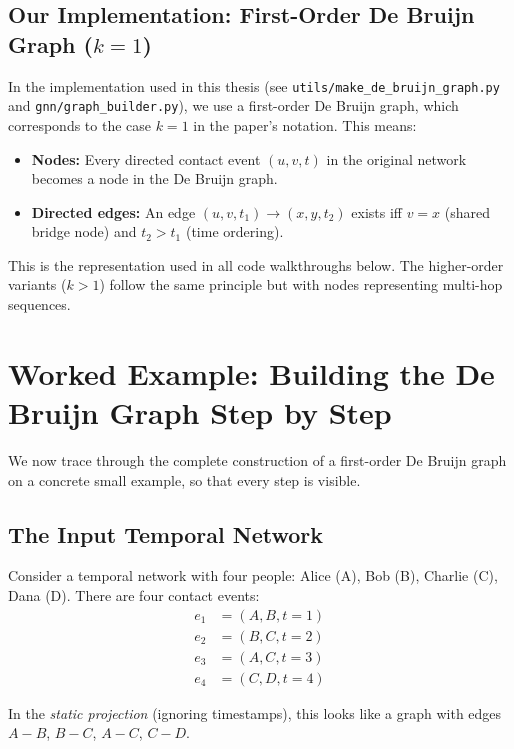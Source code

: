 \subsection{Our Implementation: First-Order De Bruijn Graph ($k=1$)}

In the implementation used in this thesis (see \texttt{utils/make\_de\_bruijn\_graph.py} and
\texttt{gnn/graph\_builder.py}), we use a first-order De Bruijn graph, which corresponds to the
case $k=1$ in the paper's notation. This means:
\begin{itemize}[noitemsep]
    \item \textbf{Nodes:} Every directed contact event $(u, v, t)$ in the original network
          becomes a node in the De Bruijn graph.
    \item \textbf{Directed edges:} An edge $(u, v, t_1) \to (x, y, t_2)$ exists iff $v = x$
          (shared bridge node) and $t_2 > t_1$ (time ordering).
\end{itemize}
This is the representation used in all code walkthroughs below. The higher-order variants ($k>1$)
follow the same principle but with nodes representing multi-hop sequences.

\section{Worked Example: Building the De Bruijn Graph Step by Step}

We now trace through the complete construction of a first-order De Bruijn graph on a concrete
small example, so that every step is visible.

\subsection{The Input Temporal Network}

Consider a temporal network with four people: Alice (A), Bob (B), Charlie (C), Dana (D). There
are four contact events:
\begin{align*}
    e_1 &= (A, B, t=1) \\
    e_2 &= (B, C, t=2) \\
    e_3 &= (A, C, t=3) \\
    e_4 &= (C, D, t=4)
\end{align*}

In the \emph{static projection} (ignoring timestamps), this looks like a graph with edges
$A-B$, $B-C$, $A-C$, $C-D$.

